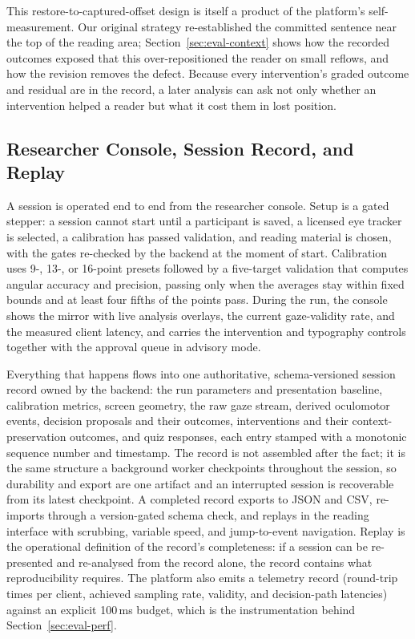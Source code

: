 This restore-to-captured-offset design is itself a product of the platform's self-measurement.
Our original strategy re-established the committed sentence near the top of the reading area; Section~\ref{sec:eval-context} shows how the recorded outcomes exposed that this over-repositioned the reader on small reflows, and how the revision removes the defect.
Because every intervention's graded outcome and residual are in the record, a later analysis can ask not only whether an intervention helped a reader but what it cost them in lost position.

\subsection{Researcher Console, Session Record, and Replay}
\label{sec:platform-record}

A session is operated end to end from the researcher console.
Setup is a gated stepper: a session cannot start until a participant is saved, a licensed eye tracker is selected, a calibration has passed validation, and reading material is chosen, with the gates re-checked by the backend at the moment of start.
Calibration uses 9-, 13-, or 16-point presets followed by a five-target validation that computes angular accuracy and precision, passing only when the averages stay within fixed bounds and at least four fifths of the points pass.
During the run, the console shows the mirror with live analysis overlays, the current gaze-validity rate, and the measured client latency, and carries the intervention and typography controls together with the approval queue in advisory mode.

Everything that happens flows into one authoritative, schema-versioned session record owned by the backend: the run parameters and presentation baseline, calibration metrics, screen geometry, the raw gaze stream, derived oculomotor events, decision proposals and their outcomes, interventions and their context-preservation outcomes, and quiz responses, each entry stamped with a monotonic sequence number and timestamp.
The record is not assembled after the fact; it is the same structure a background worker checkpoints throughout the session, so durability and export are one artifact and an interrupted session is recoverable from its latest checkpoint.
A completed record exports to JSON and CSV, re-imports through a version-gated schema check, and replays in the reading interface with scrubbing, variable speed, and jump-to-event navigation.
Replay is the operational definition of the record's completeness: if a session can be re-presented and re-analysed from the record alone, the record contains what reproducibility requires.
The platform also emits a telemetry record (round-trip times per client, achieved sampling rate, validity, and decision-path latencies) against an explicit 100\,ms budget, which is the instrumentation behind Section~\ref{sec:eval-perf}.
